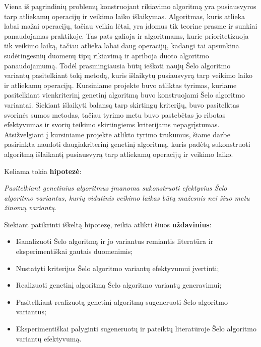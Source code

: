 \documentclass{VUMIFInfBakalaurinis}
\begin{document}
Viena iš pagrindinių problemų konstruojant rikiavimo algoritmą yra pusiausvyros tarp atliekamų operacijų ir veikimo laiko išlaikymas.
Algoritmas, kuris atlieka labai mažai operacijų, tačiau veikia lėtai, yra įdomus tik teorine prasme ir sunkiai panaudojamas praktikoje.
Tas pats galioja ir algoritmams, kurie prioritetizuoja tik veikimo laiką, tačiau atlieka labai daug operacijų, kadangi 
tai apsunkina sudėtingesnių duomenų tipų rikiavimą ir apriboja duoto algoritmo panaudojamumą.
Todėl prasmingiausia būtų ieškoti naujų Šelo algoritmo variantų pasitelkiant tokį metodą, kuris išlaikytų pusiausvyrą tarp veikimo laiko ir atliekamų operacijų.
Kursiniame projekte buvo atliktas tyrimas, kuriame pasitelkiant vienkriterinį genetinį algoritmą buvo konstruojami
Šelo algoritmo variantai.
Siekiant išlaikyti balansą tarp skirtingų kriterijų, buvo pasitelktas svorinės sumos metodas, tačiau
tyrimo metu buvo pastebėtas jo ribotas efektyvumas ir svorių teikimo skirtingiems kriterijams nepagrįstumas.
Atsižvelgiant į kursiniame projekte atlikto tyrimo trūkumus, šiame darbe pasirinkta naudoti daugiakriterinį genetinį algoritmą, kuris
padėtų sukonstruoti algoritmą išlaikantį pusiausvyrą tarp atliekamų operacijų ir veikimo laiko.

\medskip

Keliama tokia \textbf{hipotezė}:

\textit{Pasitelkiant genetinius algoritmus įmanoma sukonstruoti efektyvius Šelo algoritmo variantus,
kurių vidutinis veikimo laikas būtų mažesnis nei šiuo metu žinomų variantų.}

\medskip

Siekiant patikrinti iškeltą hipotezę, reikia atlikti šiuos \textbf{uždavinius}:
\begin{itemize}
    \item Išanalizuoti Šelo algoritmą ir jo variantus remiantis literatūra ir eksperimentiškai gautais duomenimis;
    \item Nustatyti kriterijus Šelo algoritmo variantų efektyvumui įvertinti;
    \item Realizuoti genetinį algoritmą Šelo algoritmo variantų generavimui;
    \item Pasitelkiant realizuotą genetinį algoritmą sugeneruoti Šelo algoritmo variantus;
    \item Eksperimentiškai palyginti sugeneruotų ir pateiktų literatūroje Šelo algoritmo variantų efektyvumą.
  \end{itemize}

\medskip
\end{document}

